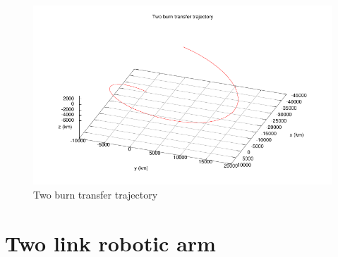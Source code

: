 \documentclass[a4paper,11pt]{report}    %
\begin{document}
\begin{figure}
  \centering 
  \includegraphics{../examples/twoburn/trajectory}
  \caption{Two burn transfer trajectory}
 \label{fig:twoburn_trajectory}
\end{figure}




\section{Two link robotic arm}
\end{document}
